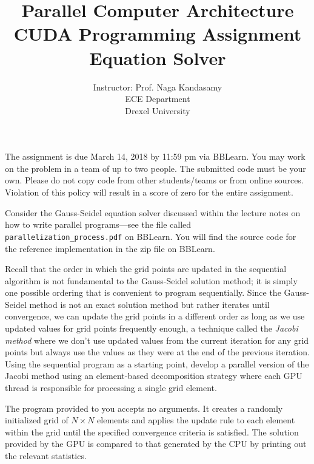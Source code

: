 \documentclass[12pt]{article}
\begin{document}
\title{Parallel Computer Architecture \\
CUDA Programming Assignment \\
Equation Solver}
\author{Instructor: Prof. Naga Kandasamy \\
 ECE Department \\ Drexel University}
\maketitle %
\date{}

The assignment is due March 14, 2018 by 11:59 pm via BBLearn. You may work on the problem in a team of up to two people. The submitted code must be your own. Please do not copy code from other students/teams or from online sources. Violation of this policy will result in a score of zero for the entire assignment.
\vspace{12pt}

Consider the Gauss-Seidel equation solver discussed within the lecture notes on how to write parallel programs---see the file called \texttt{parallelization\_process.pdf} on BBLearn. You will find the source code for the reference implementation in the zip file on BBLearn. 

Recall that the order in which the grid points are updated in the sequential algorithm is not fundamental to the Gauss-Seidel solution method; it is simply one possible ordering that is convenient to program sequentially. Since the Gauss-Seidel method is not an exact solution method but rather iterates until convergence, we can update the grid points in a different order as long as we use updated values for grid points frequently enough, a technique called the \emph{Jacobi method} where we don't use updated values from the current iteration for any grid points but always use the values as they were at the end of the previous iteration. Using the sequential program as a starting point, develop a parallel version of the Jacobi method using an element-based decomposition strategy where each GPU thread is responsible for processing a single grid element. 

The program provided to you accepts no arguments. It creates a randomly initialized grid of $N \times N$ elements and applies the update rule to each element within the grid until the specified convergence criteria is satisfied. The solution provided by the GPU is compared to that generated by the CPU by printing out the relevant statistics. 
\end{document}
